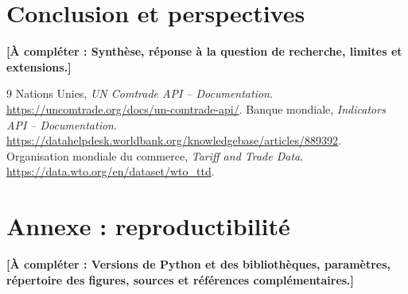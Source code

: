 \documentclass[11pt,a4paper]{article}
\newcommand{\achanger}[1]{\textcolor{blue!60!black}{\textbf{[À compléter : #1]}}}
\begin{document}
\section{Conclusion et perspectives}\label{sec:conclusion}
\achanger{Synthèse, réponse à la question de recherche, limites et extensions.}
\begin{thebibliography}{9}
 Nations Unies, \emph{UN Comtrade API -- Documentation}. \url{https://uncomtrade.org/docs/un-comtrade-api/}.
 Banque mondiale, \emph{Indicators API -- Documentation}. \url{https://datahelpdesk.worldbank.org/knowledgebase/articles/889392}.
 Organisation mondiale du commerce, \emph{Tariff and Trade Data}. \url{https://data.wto.org/en/dataset/wto_ttd}.
\end{thebibliography}
\appendix
\section{Annexe : reproductibilité}\achanger{Versions de Python et des bibliothèques, paramètres, répertoire des figures, sources et références complémentaires.}
\end{document}
